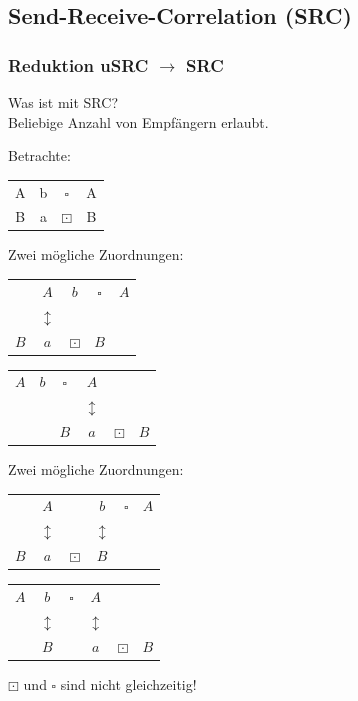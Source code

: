 \documentclass[ignorenonframetext]{beamer}
\newcommand{\mybreak}{\par\vspace*{\baselineskip}}
\begin{document}
\subsection{Send-Receive-Correlation (SRC)}
\begin{frame}
	\frametitle{Reduktion uSRC $\rightarrow$ SRC}
	Was ist mit SRC? \\
  Beliebige Anzahl von Empfängern erlaubt.\mybreak

\pause

	Betrachte:
	
	\begin{center}
\begin{tabular}{cccc}
	A&b&$\square$&A\\
	B&a&$\boxdot$&B\\
\end{tabular}
	\end{center}

\begin{overprint}

Zwei mögliche Zuordnungen:\mybreak
\begin{tabular}{ccccc}
	&$A$&$b$        &$\square$&$A$ \\
	&$\updownarrow$\\
	$B$&$a$&$\boxdot$&$B$        &  \\
\end{tabular}
\hspace{1cm}\vline\hspace{1cm}
\begin{tabular}{cccccc}
	$A$&$b$&$\square$&$A$\\
	& &         &$\updownarrow$\\
	& &  $B$      &$a$&$\boxdot$&$B$\\
\end{tabular}\mybreak



Zwei mögliche Zuordnungen:\mybreak
\begin{tabular}{cccccc}
	&$A$ &         &$b$        &$\square$&$A$ \\
	&  $\updownarrow$ & &$\updownarrow $\\
	$B$&$a$&$\boxdot$&$B$        &  \\
\end{tabular}
\hspace{1cm}\vline\hspace{1cm}
\begin{tabular}{cccccc}
	$A$& $b$&$\square$&$A$\\
	&   $\updownarrow $      & &$\updownarrow$\\
	&  $B$ &     &$a$&$\boxdot$&$B$\\
\end{tabular}\mybreak

$\boxdot$ und $\square$ sind nicht gleichzeitig!

\end{overprint}


\end{frame}
\end{document}
